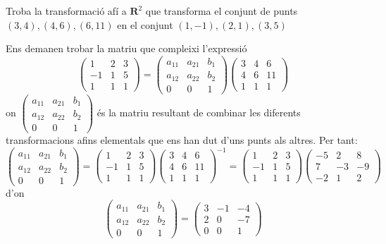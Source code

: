 \Exercise Troba la transformació afí a \(\mathbf {R}^2\) que transforma el conjunt de punts \({(3,4),(4,6),(6,11)}\) en el conjunt \({(1,-1),(2,1),(3,5)}\) 

\Answer 
Ens demanen trobar la matriu que compleixi l’expressió
\[ \begin {pmatrix}1&2&3\\-1&1&5\\1&1&1\end {pmatrix}= \begin {pmatrix}a_{11}&a_{21}&b_1\\a_{12}&a_{22}&b_2\\0&0&1\end {pmatrix} \begin {pmatrix}3&4&6\\4&6&11\\1&1&1\end {pmatrix} \]
on \(\begin {pmatrix}a_{11}&a_{21}&b_1\\a_{12}&a_{22}&b_2\\0&0&1\end {pmatrix}\) és la matriu resultant de combinar les diferents transformacions afins elementals que ens han dut d’uns punts als altres. Per tant:
\[ \begin {pmatrix}a_{11}&a_{21}&b_1\\a_{12}&a_{22}&b_2\\0&0&1\end {pmatrix}= \begin {pmatrix}1&2&3\\-1&1&5\\1&1&1\end {pmatrix} \begin {pmatrix}3&4&6\\4&6&11\\1&1&1\end {pmatrix}^{-1}= \begin {pmatrix}1&2&3\\-1&1&5\\1&1&1\end {pmatrix} \begin {pmatrix}-5&2&8\\7&-3&-9\\-2&1&2\end {pmatrix} \]
d’on
\[\begin {pmatrix}a_{11}&a_{21}&b_1\\a_{12}&a_{22}&b_2\\0&0&1\end {pmatrix}= \begin {pmatrix}3&-1&-4\\2&0&-7\\0&0&1\end {pmatrix} \]

\blacksquare
